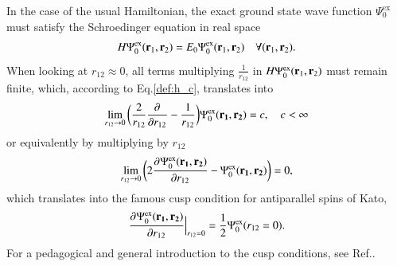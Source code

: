 \documentclass[aip,jcp,reprint,noshowkeys,superscriptaddress]{revtex4-1}
\newcommand{\deriv}[3]{\frac{\partial^{#3} #1}{\partial {#2}^{#3}}}
\newcommand{\bd}[1]{{\bf {#1}}}
\newcommand{\br}[0]{{\bf {r}}}
\newcommand{\psiex}[0]{\Psi^{\text{ex}}_0}
\begin{document}
In the case of the usual Hamiltonian, the exact ground state wave function $\psiex$ must satisfy the Schroedinger equation in real space 
\begin{equation}
 H \psiex(\br{}_1,\br{}_2) = E_0 \psiex(\br{}_1,\br{}_2)\quad \forall (\br{}_1,\br{}_2).
\end{equation}
When looking at $r_{12}\approx 0$, all terms multiplying $\frac{1}{r_{12}}$ in $H \psiex(\br{}_1,\br{}_2)$ must remain finite, which, according to Eq.\eqref{def:h_c}, translates into
\begin{equation}
 \label{eq:cusp_0}
 \lim_{r_{12}\rightarrow 0}\bigg( \frac{2}{r_{12}} \deriv{}{r_{12}}{} -\frac{1}{r_{12}}\bigg) \psiex(\bd{r_1},\bd{r_2})  = c,\quad c<\infty 
\end{equation}
or equivalently by multiplying by $r_{12}$
\begin{equation}
 \lim_{r_{12}\rightarrow 0}\bigg( 2 \deriv{\psiex(\bd{r_1},\bd{r_2})}{r_{12}}{} -\psiex(\bd{r_1},\bd{r_2}) \bigg) = 0, 
\end{equation}
which translates into the famous cusp condition for antiparallel spins of Kato\cite{Kat-CPAM-57}, 
\begin{equation}
 \deriv{\psiex(\bd{r_1},\bd{r_2})}{r_{12}}{}\Bigr|_{r_{12}=0} = \frac{1}{2} \psiex(r_{12}=0). 
\end{equation} 
For a pedagogical and general introduction to the cusp conditions, see Ref.. 
\end{document}
